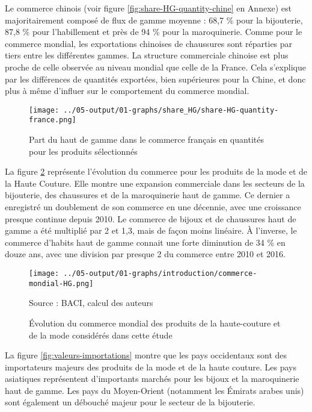 \documentclass[french,10pt,a4paper]{article}
\begin{document}
Le commerce chinois (voir figure \ref{fig:share-HG-quantity-chine} en Annexe) est majoritairement composé de flux de gamme moyenne : 68,7 \% pour la bijouterie, 87,8 \% pour l'habillement et près de 94 \% pour la maroquinerie. Comme pour le commerce mondial, les exportations chinoises de chaussures sont réparties par tiers entre les différentes gammes. La structure commerciale chinoise est plus proche de celle observée au niveau mondial que celle de la France. Cela s'explique par les différences de quantités exportées, bien supérieures pour la Chine, et donc plus à même d'influer sur le comportement du commerce mondial. 

\begin{figure}[!h]
  \centering
  \texttt{[image: ../05-output/01-graphs/share\_HG/share-HG-quantity-france.png]}
  \caption{Part du haut de gamme dans le commerce français en quantités pour les produits sélectionnés}
  \label{fig:share-HG-quantity-france}
\end{figure}


\bigskip

La figure \ref{fig:commerce-mondial-HG} représente l'évolution du commerce pour les produits de la mode et de la Haute Couture. Elle montre une expansion commerciale dans les secteurs de la bijouterie, des chaussures et de la maroquinerie haut de gamme. Ce dernier a enregistré un doublement de son commerce en une décennie, avec une croissance presque continue depuis 2010. Le commerce de bijoux et de chaussures haut de gamme a été multiplié par 2 et 1,3, mais de façon moins linéaire. À l'inverse, le commerce d'habits haut de gamme connait une forte diminution de 34 \% en douze ans, avec une division par presque 2 du commerce entre 2010 et 2016.

\begin{figure}[!h]
  \centering
  \texttt{[image: ../05-output/01-graphs/introduction/commerce-mondial-HG.png]}
  \captionsetup{justification=raggedright,singlelinecheck=false, font=small}
  \caption*{Source : BACI, calcul des auteurs}
  \captionsetup{justification=centering, singlelinecheck=true, font=normalsize}
  \caption{Évolution du commerce mondial des produits de la haute-couture et de la mode considérés dans cette étude}
  \label{fig:commerce-mondial-HG}
\end{figure}

La figure \ref{fig:valeurs-importations} montre que les pays occidentaux sont des importateurs majeurs des produits de la mode et de la haute couture. Les pays asiatiques représentent d'importants marchés pour les bijoux et la maroquinerie haut de gamme. Les pays du Moyen-Orient (notamment les Émirats arabes unis) sont également un débouché majeur pour le secteur de la bijouterie. 
\end{document}
